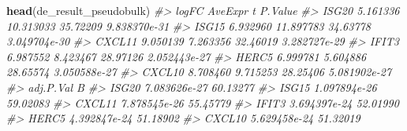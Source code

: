 \documentclass[
]{book}
\newenvironment{Shaded}{\begin{snugshade}}{\end{snugshade}}
\newcommand{\CommentTok}[1]{\textcolor[rgb]{0.56,0.35,0.01}{\textit{#1}}}
\newcommand{\FunctionTok}[1]{\textcolor[rgb]{0.13,0.29,0.53}{\textbf{#1}}}
\newcommand{\NormalTok}[1]{#1}
\begin{document}
\begin{Shaded}
\begin{Highlighting}[]
\FunctionTok{head}\NormalTok{(de\_result\_pseudobulk)}
\CommentTok{\#\textgreater{}           logFC   AveExpr        t      P.Value}
\CommentTok{\#\textgreater{} ISG20  5.161336 10.313033 35.72209 9.838370e{-}31}
\CommentTok{\#\textgreater{} ISG15  6.932960 11.897783 34.63778 3.049704e{-}30}
\CommentTok{\#\textgreater{} CXCL11 9.050139  7.263356 32.46019 3.282727e{-}29}
\CommentTok{\#\textgreater{} IFIT3  6.987552  8.423467 28.97126 2.052443e{-}27}
\CommentTok{\#\textgreater{} HERC5  6.999781  5.604886 28.65574 3.050588e{-}27}
\CommentTok{\#\textgreater{} CXCL10 8.708460  9.715253 28.25406 5.081902e{-}27}
\CommentTok{\#\textgreater{}           adj.P.Val        B}
\CommentTok{\#\textgreater{} ISG20  7.083626e{-}27 60.13277}
\CommentTok{\#\textgreater{} ISG15  1.097894e{-}26 59.02083}
\CommentTok{\#\textgreater{} CXCL11 7.878545e{-}26 55.45779}
\CommentTok{\#\textgreater{} IFIT3  3.694397e{-}24 52.01990}
\CommentTok{\#\textgreater{} HERC5  4.392847e{-}24 51.18902}
\CommentTok{\#\textgreater{} CXCL10 5.629458e{-}24 51.32019}
\end{Highlighting}
\end{Shaded}
\end{document}
